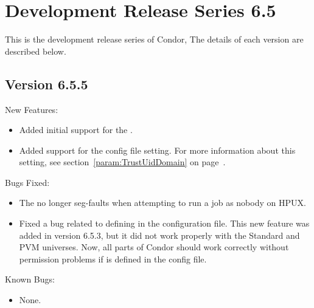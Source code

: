 \section{\label{sec:History-6-5}Development Release Series 6.5}

This is the development release series of Condor,
The details of each version are described below.

\subsection{\label{sec:New-6-5-5}Version 6.5.5}

\noindent New Features:

\begin{itemize}

\item Added initial support for the .

\item Added support for the  config file
  setting.
  For more information about this setting, see
  section~\ref{param:TrustUidDomain} on
  page~\pageref{param:TrustUidDomain}. 

\end{itemize}

\noindent Bugs Fixed:

\begin{itemize}

\item The  no longer seg-faults when attempting to run
  a job as nobody on HPUX.

\item Fixed a bug related to defining  in the
  configuration file.
  This new feature was added in version 6.5.3, but it did not work
  properly with the Standard and PVM universes.
  Now, all parts of Condor should work correctly without permission
  problems if  is defined in the config file.

\end{itemize}

\noindent Known Bugs:

\begin{itemize}

\item None.

\end{itemize}



